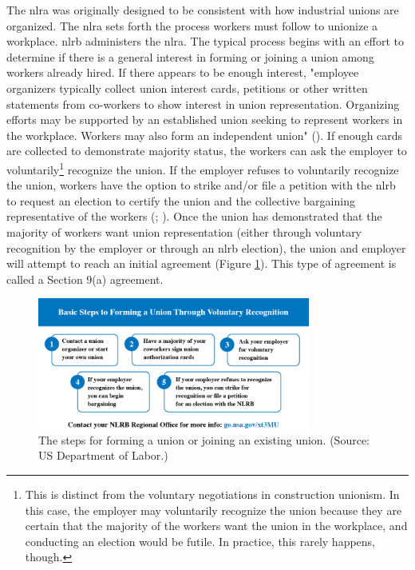 \documentclass[12pt]{article}
\newcommand{\imageWidth}{0.8\textwidth}
\begin{document}
The \acrfull{nlra} was originally designed to be consistent with how industrial unions are organized. The \acrshort{nlra} sets forth the process workers must follow to unionize a workplace. \acrfull{nlrb} administers the \acrshort{nlra}. The typical process begins with an effort to determine if there is a general interest in forming or joining a union among workers already hired. If there appears to be enough interest, "employee organizers typically collect union interest cards, petitions or other written statements from co-workers to show interest in union representation. Organizing efforts may be supported by an established union seeking to represent workers in the workplace. Workers may also form an independent union" (\cite["How can I form a union?"]{dolWORKCenterUnions}). If enough cards are collected to demonstrate majority status, the workers can ask the employer to voluntarily\footnote{This is distinct from the voluntary negotiations in construction unionism. In this case, the employer may voluntarily recognize the union because they are certain that the majority of the workers want the union in the workplace, and conducting an election would be futile. In practice, this rarely happens, though.} recognize the union. If the employer refuses to voluntarily recognize the union, workers have the option to strike and/or file a petition with the \acrshort{nlrb} to request an election to certify the union and the collective bargaining representative of the workers (\cite["How can I form a union?"]{dolWORKCenterUnions}; \cite{nlrbNLRBProcess}). Once the union has demonstrated that the majority of workers want union representation (either through voluntary recognition by the employer or through an \acrshort{nlrb} election), the union and employer will attempt to reach an initial agreement (Figure \ref{fig:DOL}). This type of agreement is called a Section 9(a) agreement.

\begin{figure}[ht]
  \centering
  \includegraphics[width=\imageWidth]{images/DOL}
  \captionsetup{justification=centering, singlelinecheck=false, margin=2cm}
  \caption[Forming a Union]{The steps for forming a union or joining an existing union. (Source: US Department of Labor.)}
  \label{fig:DOL}
\end{figure}
\end{document}
